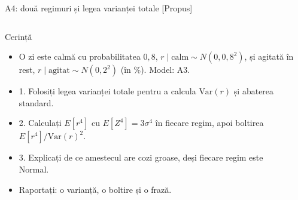 \begin{frame}{A4: două regimuri și legea varianței totale [Propus]}
\propsub
\itemsize{\scriptsize}
\begin{columns}[T]
\begin{column}{\taskw}
\begin{block}{Cerință}
\begin{itemize}
    \item O zi este calmă cu probabilitatea $0{,}8$, $r \mid \text{calm} \sim N(0, 0{,}8^2)$, și agitată în rest, $r \mid \text{agitat} \sim N(0, 2^2)$ (în \%). Model: A3.
    \item 1. Folosiți legea varianței totale pentru a calcula $\text{Var}(r)$ și abaterea standard.
    \item 2. Calculați $E[r^4]$ cu $E[Z^4] = 3\sigma^4$ în fiecare regim, apoi boltirea $E[r^4]/\text{Var}(r)^2$.
    \item 3. Explicați de ce amestecul are cozi groase, deși fiecare regim este Normal.
    \item Raportați: o varianță, o boltire și o frază.
\end{itemize}
\end{block}
\end{column}
\begin{column}{\solw}
\end{column}
\end{columns}
\end{frame}

